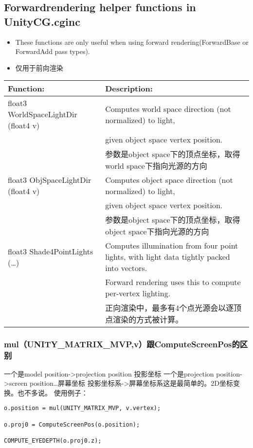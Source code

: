 \documentclass[9pt, b5paper]{article}
\begin{document}
\subsection{Forwardrendering helper functions in UnityCG.cginc}
\label{sec-1-3}
\begin{itemize}
\item These functions are only useful when using forward rendering(ForwardBase or ForwardAdd pass types).
\item 仅用于前向渲染
\end{itemize}
\begin{center}
\begin{tabular}{ll}
\hline
Function: & Description:\\
\hline
float3 WorldSpaceLightDir (float4 v) & Computes world space direction (not normalized) to light,\\
 & given object space vertex position.\\
 & 参数是object space下的顶点坐标，取得world space下指向光源的方向\\
\hline
float3 ObjSpaceLightDir (float4 v) & Computes object space direction (not normalized) to light,\\
 & given object space vertex position.\\
 & 参数是object space下的顶点坐标，取得object space下指向光源的方向\\
\hline
float3 Shade4PointLights (\ldots{}) & Computes illumination from four point lights, with light data tightly packed into vectors.\\
 & Forward rendering uses this to compute per-vertex lighting.\\
 & 正向渲染中，最多有4个点光源会以逐顶点渲染的方式被计算。\\
\hline
\end{tabular}
\end{center}

\subsubsection{mul（UNITY\_MATRIX\_MVP,v）跟ComputeScreenPos的区别}
\label{sec-1-3-1}
一个是model position->projection position 投影坐标
一个是projection position->screen position\ldots{}屏幕坐标
投影坐标系->屏幕坐标系这是最简单的。2D坐标变换。也不多说。
使用例子：
\begin{verbatim}
o.position = mul(UNITY_MATRIX_MVP, v.vertex);

o.proj0 = ComputeScreenPos(o.position);

COMPUTE_EYEDEPTH(o.proj0.z);
\end{verbatim}
\end{document}
